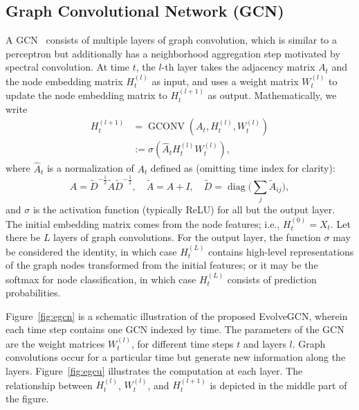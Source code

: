 \documentclass[letterpaper]{article} %
\DeclareMathOperator{\diag}{diag}
\DeclareMathOperator{\gconv}{GCONV}
\begin{document}
\subsection{Graph Convolutional Network (GCN)}\label{sec:gconv}
A GCN~\cite{Kipf2017} consists of multiple layers of graph convolution, which is similar to a perceptron but additionally has a neighborhood aggregation step motivated by spectral convolution. At time $t$, the $l$-th layer takes the adjacency matrix $A_t$ and the node embedding matrix $H_t^{(l)}$ as input, and uses a weight matrix $W_t^{(l)}$ to update the node embedding matrix to $H_t^{(l+1)}$ as output. Mathematically, we write
\begin{align}
  H_t^{(l+1)} &= \gconv(A_t, H_t^{(l)}, W_t^{(l)}) \nonumber \\
  &:= \sigma(\widehat{A}_t H_t^{(l)} W_t^{(l)}), \label{eqn:gcn}
\end{align}
where $\widehat{A}_t$ is a normalization of $A_t$ defined as (omitting time index for clarity):
\[
\widehat{A}=\widetilde{D}^{-\frac{1}{2}}\widetilde{A}\widetilde{D}^{-\frac{1}{2}},
\quad \widetilde{A}=A+I,
\quad \widetilde{D}=\diag\Bigg(\sum_j\widetilde{A}_{ij}\Bigg),
\]
and $\sigma$ is the activation function (typically ReLU) for all but the output layer. The initial embedding matrix comes from the node features; i.e., $H_t^{(0)}=X_t$. Let there be $L$ layers of graph convolutions. For the output layer, the function $\sigma$ may be considered the identity, in which case $H_t^{(L)}$ contains high-level representations of the graph nodes transformed from the initial features; or it may be the softmax for node classification, in which case $H_t^{(L)}$ consists of prediction probabilities.


Figure~\ref{fig:egcn} is a schematic illustration of the proposed EvolveGCN, wherein each time step contains one GCN indexed by time. The parameters of the GCN are the weight matrices $W_t^{(l)}$, for different time steps $t$ and layers $l$. Graph convolutions occur for a particular time but generate new information along the layers. Figure~\ref{fig:egcu} illustrates the computation at each layer. The relationship between $H_t^{(l)}$, $W_t^{(l)}$, and $H_t^{(l+1)}$ is depicted in the middle part of the figure.
\end{document}
